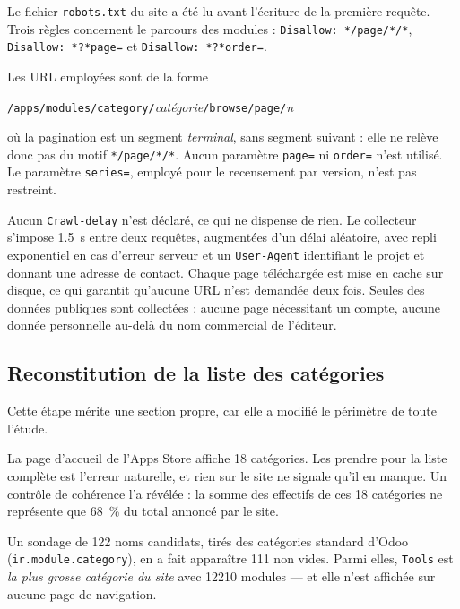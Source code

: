 \documentclass[11pt,a4paper]{article}
\begin{document}
Le fichier \texttt{robots.txt} du site a été lu avant l'écriture de la première
requête. Trois règles concernent le parcours des modules :
\texttt{Disallow:~*/page/*/*}, \texttt{Disallow:~*?*page=} et
\texttt{Disallow:~*?*order=}.

Les URL employées sont de la forme

\begin{center}
\texttt{/apps/modules/category/}\textit{catégorie}\texttt{/browse/page/}\textit{n}
\end{center}

\noindent où la pagination est un segment \emph{terminal}, sans segment
suivant : elle ne relève donc pas du
motif \texttt{*/page/*/*}. Aucun paramètre \texttt{page=} ni \texttt{order=}
n'est utilisé. Le paramètre \texttt{series=}, employé pour le recensement par
version, n'est pas restreint.

Aucun \texttt{Crawl-delay} n'est déclaré, ce qui ne dispense de rien. Le
collecteur s'impose \SI{1.5}{\second} entre deux requêtes, augmentées d'un délai
aléatoire, avec repli exponentiel en cas d'erreur serveur et un
\texttt{User-Agent} identifiant le projet et donnant une adresse de contact.
Chaque page téléchargée est mise en cache sur disque, ce qui garantit qu'aucune
URL n'est demandée deux fois. Seules des données publiques sont collectées :
aucune page nécessitant un compte, aucune donnée personnelle au-delà du nom
commercial de l'éditeur.

\subsection{Reconstitution de la liste des catégories}
\label{sec:categories}

Cette étape mérite une section propre, car elle a modifié le périmètre de toute
l'étude.

La page d'accueil de l'Apps Store affiche \num{18} catégories. Les prendre pour
la liste complète est l'erreur naturelle, et rien sur le site ne signale qu'il
en manque. Un contrôle de cohérence l'a révélée : la somme des effectifs de ces
\num{18} catégories ne représente que \SI{68}{\percent} du total annoncé par le
site.

Un sondage de \num{122} noms candidats, tirés des catégories standard d'Odoo
(\texttt{ir.module.\allowbreak category}), en a fait apparaître \num{111} non vides. Parmi
elles, \texttt{Tools} est \emph{la plus grosse catégorie du site} avec
\num{12210} modules --- et elle n'est affichée sur aucune page de navigation.
\end{document}
